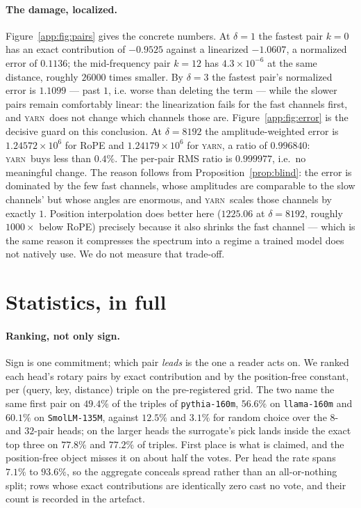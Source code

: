 \documentclass{article}
\theoremstyle{plain}
\theoremstyle{remark}
\newcommand{\yarn}{\textsc{yarn}}
\begin{document}
\paragraph{The damage, localized.} Figure~\ref{app:fig:pairs} gives the concrete
numbers. At $\delta = 1$ the fastest pair $k = 0$ has an exact contribution of
$-0.9525$ against a linearized $-1.0607$, a normalized error of $0.1136$; the
mid-frequency pair $k = 12$ has $4.3\times10^{-6}$ at the same distance, roughly
$26000$ times smaller. By $\delta = 3$ the fastest pair's normalized error is
$1.1099$ --- past $1$, i.e. worse than deleting the term --- while the slower
pairs remain comfortably linear: the linearization fails for the fast channels
first, and \yarn\ does not change which channels those are.
Figure~\ref{app:fig:error} is the decisive guard on this conclusion. At
$\delta = 8192$ the amplitude-weighted error is $1.24572\times10^{6}$ for RoPE
and $1.24179\times10^{6}$ for \yarn, a ratio of $0.996840$: \yarn\ buys less
than $0.4\%$. The per-pair RMS ratio is $0.999977$, i.e.\ no meaningful change.
The reason follows from Proposition~\ref{prop:blind}: the error is dominated by
the few fast channels, whose amplitudes are comparable to the slow channels'
but whose angles are enormous, and \yarn\ scales those channels by exactly $1$.
Position interpolation does better here ($1225.06$ at $\delta = 8192$, roughly
$1000\times$ below RoPE) precisely because it also shrinks the fast channel ---
which is the same reason it compresses the spectrum into a regime a trained
model does not natively use. We do not measure that trade-off.

\section{Statistics, in full}
\label{app:stats}

\paragraph{Ranking, not only sign.} Sign is one commitment; which pair
\emph{leads} is the one a reader acts on. We ranked each head's rotary pairs by
exact contribution and by the position-free constant, per (query, key, distance)
triple on the pre-registered grid. The two name the same first pair on $49.4\%$
of the triples of \texttt{pythia-160m}, $56.6\%$ on \texttt{llama-160m} and
$60.1\%$ on \texttt{SmolLM-135M}, against $12.5\%$ and $3.1\%$ for random choice
over the $8$- and $32$-pair heads; on the larger heads the surrogate's pick
lands inside the exact top three on $77.8\%$ and $77.2\%$ of triples. First
place is what is claimed, and the position-free object misses it on about half
the votes. Per head the rate spans $7.1\%$ to $93.6\%$, so the aggregate
conceals spread rather than an all-or-nothing split; rows whose exact
contributions are identically zero cast no vote, and their count is recorded in
the artefact.
\end{document}
